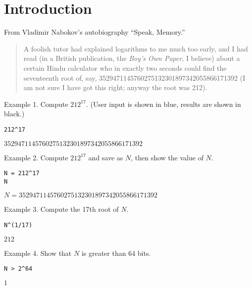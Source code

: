 

\section*{Introduction}

From Vladimir Nabokov's autobiography ``Speak, Memory.''
\begin{quote}
A foolish tutor had explained logarithms to me much too early, and I had
read (in a British publication, the {\it Boy's Own Paper}, I believe)
about a certain Hindu calculator who in exactly two seconds could find the
seventeenth root of, say,
3529471145760275132301897342055866171392
(I am not sure I have got this right; anyway the root was 212).
\end{quote}

Example 1. Compute $212^{17}$.
(User input is shown in blue, results are shown in black.)

{\color{blue}
\begin{verbatim}
212^17
\end{verbatim}}

$3529471145760275132301897342055866171392$

\bigskip
Example 2. Compute $212^{17}$ and save as $N$,
then show the value of $N$.

{\color{blue}
\begin{verbatim}
N = 212^17
N
\end{verbatim}}

$N=3529471145760275132301897342055866171392$

\bigskip
Example 3. Compute the 17th root of $N$.

{\color{blue}
\begin{verbatim}
N^(1/17)
\end{verbatim}}

$212$

\bigskip
Example 4. Show that $N$ is greater than 64 bits.

{\color{blue}
\begin{verbatim}
N > 2^64
\end{verbatim}}

$1$


